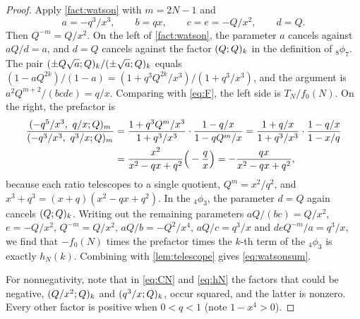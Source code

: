 \begin{proof}
Apply \cref{fact:watson} with $m=2N-1$ and
\[
a=-q^3/x^3,\qquad b=qx,\qquad c=e=-Q/x^2,\qquad d=Q .
\]
Then $Q^{-m}=Q/x^2$. On the left of \cref{fact:watson}, the parameter $a$
cancels against $aQ/d=a$, and $d=Q$ cancels against the factor $(Q;Q)_{k}$
in the definition of ${}_8\phi_7$. The pair $(\pm Q\sqrt a;Q)_{k}/(\pm\sqrt a;Q)_{k}$
equals $(1-aQ^{2k})/(1-a)=(1+q^3Q^{2k}/x^3)/(1+q^3/x^3)$, and the argument is
$a^2Q^{m+2}/(bcde)=q/x$. Comparing with \eqref{eq:F}, the left side is
$T_N/f_0(N)$. On the right, the prefactor is
\[
\begin{aligned}
\frac{(-q^5/x^3,\ q/x;Q)_{m}}{(-q^3/x^3,\ q^3/x;Q)_{m}}
&=\frac{1+q^3Q^m/x^3}{1+q^3/x^3}\cdot\frac{1-q/x}{1-qQ^m/x}
=\frac{1+q/x}{1+q^3/x^3}\cdot\frac{1-q/x}{1-x/q}\\
&=\frac{x^2}{x^2-qx+q^2}\Big(-\frac qx\Big)
=-\frac{qx}{x^2-qx+q^2},
\end{aligned}
\]
because each ratio telescopes to a single quotient, $Q^m=x^2/q^2$, and
$x^3+q^3=(x+q)(x^2-qx+q^2)$.
In the ${}_4\phi_3$, the parameter $d=Q$ again cancels $(Q;Q)_{k}$. Writing
out the remaining parameters $aQ/(bc)=Q/x^2$, $e=-Q/x^2$, $Q^{-m}=Q/x^2$,
$aQ/b=-Q^2/x^4$, $aQ/c=q^3/x$ and $deQ^{-m}/a=q^3/x$,
we find that $-f_0(N)$ times the prefactor times the $k$-th term of the
${}_4\phi_3$ is exactly $h_N(k)$. Combining with \cref{lem:telescope} gives
\eqref{eq:watsonsum}.

For nonnegativity, note that in \eqref{eq:CN} and \eqref{eq:hN} the factors
that could be negative, $(Q/x^2;Q)_{k}$ and $(q^3/x;Q)_{k}$, occur
squared, and the latter is nonzero. Every other factor is positive when
$0<q<1$ (note $1-x^4>0$).
\end{proof}
